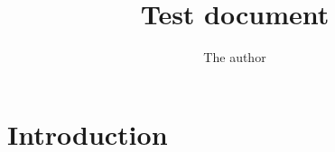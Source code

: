 \documentclass{article}
\author{The author}
\title{Test document}
\begin{document}
\maketitle

\section{Introduction}

\lipsum
\end{document}
